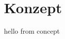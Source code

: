 \documentclass[.../Dokumentation.tex]{subfiles}
\begin{document}
    \section{Konzept}\label{sec-concept}
    hello from concept
\end{document}
